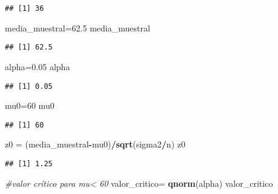 \documentclass[
]{article}
\newenvironment{Shaded}{\begin{snugshade}}{\end{snugshade}}
\newcommand{\CommentTok}[1]{\textcolor[rgb]{0.56,0.35,0.01}{\textit{#1}}}
\newcommand{\DecValTok}[1]{\textcolor[rgb]{0.00,0.00,0.81}{#1}}
\newcommand{\FloatTok}[1]{\textcolor[rgb]{0.00,0.00,0.81}{#1}}
\newcommand{\KeywordTok}[1]{\textcolor[rgb]{0.13,0.29,0.53}{\textbf{#1}}}
\newcommand{\NormalTok}[1]{#1}
\newcommand{\OperatorTok}[1]{\textcolor[rgb]{0.81,0.36,0.00}{\textbf{#1}}}
\newcommand{\StringTok}[1]{\textcolor[rgb]{0.31,0.60,0.02}{#1}}
\begin{document}
\begin{verbatim}
## [1] 36
\end{verbatim}

\begin{Shaded}
\begin{Highlighting}[]
\NormalTok{media_muestral=}\FloatTok{62.5}
\NormalTok{media_muestral}
\end{Highlighting}
\end{Shaded}

\begin{verbatim}
## [1] 62.5
\end{verbatim}

\begin{Shaded}
\begin{Highlighting}[]
\NormalTok{alpha=}\FloatTok{0.05}
\NormalTok{alpha}
\end{Highlighting}
\end{Shaded}

\begin{verbatim}
## [1] 0.05
\end{verbatim}

\begin{Shaded}
\begin{Highlighting}[]
\NormalTok{mu0=}\DecValTok{60}
\NormalTok{mu0}
\end{Highlighting}
\end{Shaded}

\begin{verbatim}
## [1] 60
\end{verbatim}

\begin{Shaded}
\begin{Highlighting}[]
\NormalTok{z0 =}\StringTok{ }\NormalTok{(media_muestral}\OperatorTok{-}\NormalTok{mu0)}\OperatorTok{/}\KeywordTok{sqrt}\NormalTok{(sigma2}\OperatorTok{/}\NormalTok{n)}
\NormalTok{z0}
\end{Highlighting}
\end{Shaded}

\begin{verbatim}
## [1] 1.25
\end{verbatim}

\begin{Shaded}
\begin{Highlighting}[]
\CommentTok{#valor crítico para mu< 60}
\NormalTok{valor_critico=}\StringTok{ }\KeywordTok{qnorm}\NormalTok{(alpha)}
\NormalTok{valor_critico}
\end{Highlighting}
\end{Shaded}
\end{document}

